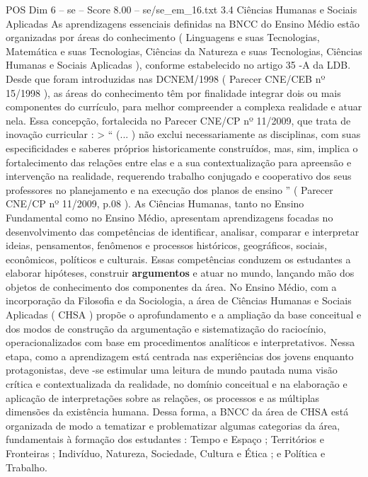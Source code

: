 \begin{textsample}{POS Dim 6 – se – Score 8.00 – se/se\_em\_16.txt}  \label{ex:f6_pos_046}
3.4 Ciências Humanas e Sociais Aplicadas As aprendizagens essenciais definidas na BNCC do Ensino Médio estão organizadas por áreas do conhecimento ( Linguagens e suas Tecnologias, Matemática e suas Tecnologias, Ciências da Natureza e suas Tecnologias, Ciências Humanas e Sociais Aplicadas ), conforme estabelecido no artigo 35 -A da LDB.
Desde que foram introduzidas nas DCNEM/1998 ( Parecer CNE/CEB nº 15/1998 ), as áreas do conhecimento têm por finalidade integrar dois ou mais componentes do currículo, para melhor compreender a complexa realidade e atuar nela.
Essa concepção, fortalecida no Parecer CNE/CP nº 11/2009, que trata de inovação curricular : > “ (... ) não exclui necessariamente as disciplinas, com suas especificidades e saberes próprios historicamente construídos, mas, sim, implica o fortalecimento das relações entre elas e a sua contextualização para apreensão e intervenção na realidade, requerendo trabalho conjugado e cooperativo dos seus professores no planejamento e na execução dos planos de ensino ” ( Parecer CNE/CP nº 11/2009, p.08 ).
As Ciências Humanas, tanto no Ensino Fundamental como no Ensino Médio, apresentam aprendizagens focadas no desenvolvimento das competências de identificar, analisar, comparar e interpretar ideias, pensamentos, fenômenos e processos históricos, geográficos, sociais, econômicos, políticos e culturais.
Essas competências conduzem os estudantes a elaborar hipóteses, construir \textbf{argumentos} e atuar no mundo, lançando mão dos objetos de conhecimento dos componentes da área.
No Ensino Médio, com a incorporação da Filosofia e da Sociologia, a área de Ciências Humanas e Sociais Aplicadas ( CHSA ) propõe o aprofundamento e a ampliação da base conceitual e dos modos de construção da argumentação e sistematização do raciocínio, operacionalizados com base em procedimentos analíticos e interpretativos.
Nessa etapa, como a aprendizagem está centrada nas experiências dos jovens enquanto protagonistas, deve -se estimular uma leitura de mundo pautada numa visão crítica e contextualizada da realidade, no domínio conceitual e na elaboração e aplicação de interpretações sobre as relações, os processos e as múltiplas dimensões da existência humana.
Dessa forma, a BNCC da área de CHSA está organizada de modo a tematizar e problematizar algumas categorias da área, fundamentais à formação dos estudantes : Tempo e Espaço ; Territórios e Fronteiras ; Indivíduo, Natureza, Sociedade, Cultura e Ética ; e Política e Trabalho.

\end{textsample}
